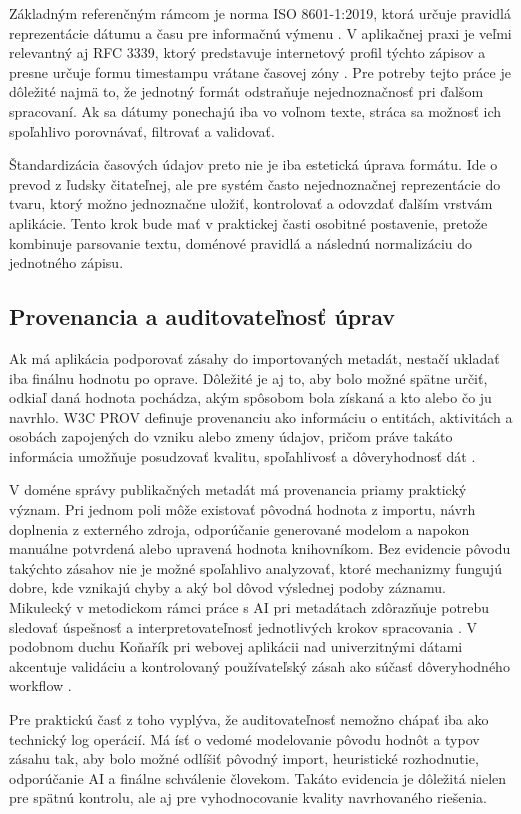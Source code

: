 Základným referenčným rámcom je norma ISO 8601-1:2019, ktorá určuje pravidlá reprezentácie dátumu a času pre informačnú výmenu \cite{ISO8601_2019}. V aplikačnej praxi je veľmi relevantný aj RFC 3339, ktorý predstavuje internetový profil týchto zápisov a presne určuje formu timestampu vrátane časovej zóny \cite{RFC3339}. Pre potreby tejto práce je dôležité najmä to, že jednotný formát odstraňuje nejednoznačnosť pri ďalšom spracovaní. Ak sa dátumy ponechajú iba vo voľnom texte, stráca sa možnosť ich spoľahlivo porovnávať, filtrovať a validovať.

Štandardizácia časových údajov preto nie je iba estetická úprava formátu. Ide o prevod z ľudsky čitateľnej, ale pre systém často nejednoznačnej reprezentácie do tvaru, ktorý možno jednoznačne uložiť, kontrolovať a odovzdať ďalším vrstvám aplikácie. Tento krok bude mať v praktickej časti osobitné postavenie, pretože kombinuje parsovanie textu, doménové pravidlá a následnú normalizáciu do jednotného zápisu.

\subsection{Provenancia a auditovateľnosť úprav}

Ak má aplikácia podporovať zásahy do importovaných metadát, nestačí ukladať iba finálnu hodnotu po oprave. Dôležité je aj to, aby bolo možné spätne určiť, odkiaľ daná hodnota pochádza, akým spôsobom bola získaná a kto alebo čo ju navrhlo. W3C PROV definuje provenanciu ako informáciu o entitách, aktivitách a osobách zapojených do vzniku alebo zmeny údajov, pričom práve takáto informácia umožňuje posudzovať kvalitu, spoľahlivosť a dôveryhodnosť dát \cite{PROVOverview}.

V doméne správy publikačných metadát má provenancia priamy praktický význam. Pri jednom poli môže existovať pôvodná hodnota z importu, návrh doplnenia z externého zdroja, odporúčanie generované modelom a napokon manuálne potvrdená alebo upravená hodnota knihovníkom. Bez evidencie pôvodu takýchto zásahov nie je možné spoľahlivo analyzovať, ktoré mechanizmy fungujú dobre, kde vznikajú chyby a aký bol dôvod výslednej podoby záznamu. Mikulecký v metodickom rámci práce s AI pri metadátach zdôrazňuje potrebu sledovať úspešnosť a interpretovateľnosť jednotlivých krokov spracovania \cite{Mikulecky2025}. V podobnom duchu Koňařík pri webovej aplikácii nad univerzitnými dátami akcentuje validáciu a kontrolovaný používateľský zásah ako súčasť dôveryhodného workflow \cite{Konarik2025}.

Pre praktickú časť z toho vyplýva, že auditovateľnosť nemožno chápať iba ako technický log operácií. Má ísť o vedomé modelovanie pôvodu hodnôt a typov zásahu tak, aby bolo možné odlíšiť pôvodný import, heuristické rozhodnutie, odporúčanie AI a finálne schválenie človekom. Takáto evidencia je dôležitá nielen pre spätnú kontrolu, ale aj pre vyhodnocovanie kvality navrhovaného riešenia.
